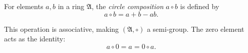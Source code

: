 For elements $a, b$ in a ring $\mathfrak{A}$, the \emph{circle composition} $a \circ b$ is defined by
$$a \circ b = a + b - ab.$$

This operation is associative, making $(\mathfrak{A}, \circ)$ a semi-group. The zero element acts as the identity:
$$a \circ 0 = a = 0 \circ a.$$
